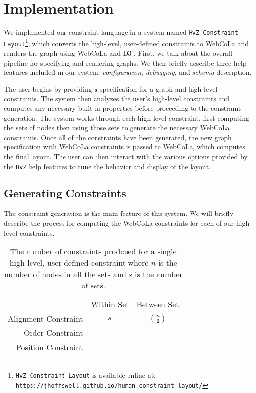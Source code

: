 \section{Implementation}
We implemented our constraint language in a system named \texttt{HvZ Constraint Layout}\footnote{\texttt{HvZ Constraint Layout} is available online at:\\ \texttt{https://jhoffswell.github.io/human-constraint-layout/}}, which converts the high-level, user-defined constraints to WebCoLa \cite{WebCoLa} and renders the graph using WebCoLa and D3 \cite{bostock:d3}. First, we talk about the overall pipeline for specifying and rendering graphs. We then briefly describe three help features included in our system: \emph{configuration}, \emph{debugging}, and \emph{schema} description.

The user begins by providing a specification for a graph and high-level constraints. The system then analyzes the user's high-level constraints and computes any necessary built-in properties before proceeding to the constraint generation. The system works through each high-level constraint, first computing the sets of nodes then using those sets to generate the necessary WebCoLa constraints. Once all of the constraints have been generated, the new graph specification with WebCoLa constraints is passed to WebCoLa, which computes the final layout. The user can then interact with the various options provided by the \texttt{HvZ} help features to tune the behavior and display of the layout.

\subsection{Generating Constraints}
The constraint generation is the main feature of this system. We will briefly describe the process for computing the WebCoLa constraints for each of our high-level constraints.

\begin{table}[]
\centering
\caption{The number of constraints prodcued for a single high-level, user-defined constraint where $n$ is the number of nodes in all the sets and $s$ is the number of sets.}
\begin{tabular}{r|c|c}
          & Within Set & Between Set        \\ \cline{1-3}
Alignment Constraint & $s$        & $n \choose 2$      \\ \cline{1-3}
Order Constraint     &            &                    \\ \cline{1-3}
Position Constraint  &            &            
\end{tabular}
\end{table}

